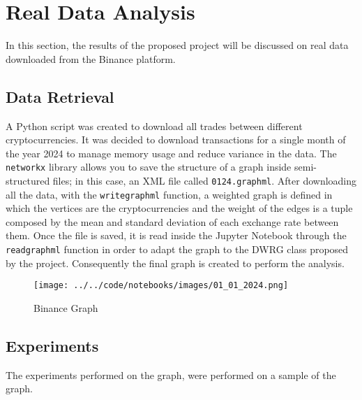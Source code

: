 \section{Real Data Analysis}\label{experiments}
In this section, the results of the proposed project will be discussed on real data downloaded from the Binance platform.
\subsection{Data Retrieval}
A Python script was created to download all trades between different cryptocurrencies. It was decided to download transactions for a single month of the year 2024 to manage memory usage and reduce variance in the data.
The \texttt{networkx} library allows you to save the structure of a graph inside semi-structured files; in this case, an XML file called \texttt{01\textunderscore 24.graphml}. 
After downloading all the data, with the \texttt{write\textunderscore graphml} function, a weighted graph is defined in which the vertices are the cryptocurrencies and the weight of the edges is a tuple composed by the mean and standard deviation of each exchange rate between them.
Once the file is saved, it is read inside the Jupyter Notebook through the \texttt{read\textunderscore graphml} function in order to adapt the graph to the DWRG class proposed by the project. Consequently the final graph is created to perform the analysis.

\begin{figure}[h!]
	\centering
	\texttt{[image: ../../code/notebooks/images/01\_01\_2024.png]} %
	\caption{Binance Graph}
	\label{graph}
\end{figure}

\subsection{Experiments}
The experiments performed on the graph, were performed on a sample of the graph.
